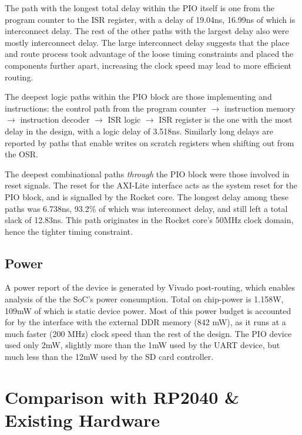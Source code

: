 The path with the longest total delay within the PIO itself is one from the program counter to the ISR register, with a delay of 19.04ns, 16.99ns of which is interconnect delay. The rest of the other paths with the largest delay also were mostly interconnect delay. The large interconnect delay suggests that the place and route process took advantage of the loose timing constraints and placed the components further apart, increasing the clock speed may lead to more efficient routing.

The deepest logic paths within the PIO block are those implementing  and  instructions: the control path from the program counter $\rightarrow$ instruction memory $\rightarrow$ instruction decoder $\rightarrow$ ISR logic $\rightarrow$ ISR register is the one with the most delay in the design, with a logic delay of 3.518ns. Similarly long delays are reported by paths that enable writes on scratch registers when shifting out from the OSR.

The deepest combinational paths \textit{through} the PIO block were those involved in reset signals. The reset for the AXI-Lite interface acts as the system reset for the PIO block, and is signalled by the Rocket core. The longest delay among these paths was 6.738ns, 93.2\% of which was interconnect delay, and still left a total slack of 12.83ns. This path originates in the Rocket core's 50MHz clock domain, hence the tighter timing constraint.

\subsection{Power}

A power report of the device is generated by Vivado post-routing, which enables analysis of the the SoC's power consumption. Total on chip-power is 1.158W, 109mW of which is static device power. Most of this power budget is accounted for by the interface with the external DDR memory (842 mW), as it runs at a much faster (200 MHz) clock speed than the rest of the design. The PIO device used only 2mW, slightly more than the 1mW used by the UART device, but much less than the 12mW used by the SD card controller.

\section{Comparison with RP2040 \& Existing Hardware}

